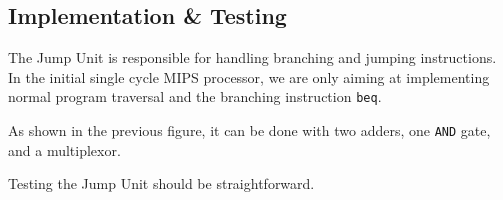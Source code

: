 \documentclass{beamer}
\begin{document}
\subsection{Implementation \& Testing}
\begin{frame}
    The Jump Unit is responsible for handling branching and jumping
    instructions. In the initial single cycle MIPS processor, we are only
    aiming at implementing normal program traversal and the branching
    instruction \texttt{beq}.

    \vspace{\baselineskip}
    As shown in the previous figure, it can be done with two adders, one
    \texttt{AND} gate, and a multiplexor.

    \vspace{\baselineskip}
    Testing the Jump Unit should be straightforward.
\end{frame}
\end{document}
